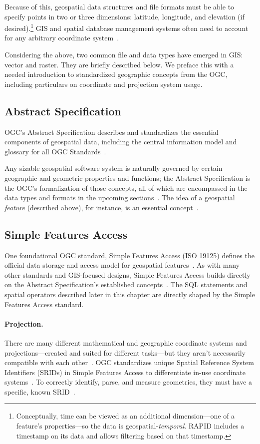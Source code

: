 Because of this, geospatial data structures and file formats must be able to specify points in two or three dimensions: latitude, longitude, and elevation (if desired).\footnote{Conceptually, time can be viewed as an additional dimension---one of a feature's properties---so the data is geospatial-\textit{temporal}. RAPID includes a timestamp on its data and allows filtering based on that timestamp.} GIS and spatial database management systems often need to account for any arbitrary coordinate system~\cite{gentle_intro}.

Considering the above, two common file and data types have emerged in GIS: vector and raster. They are briefly described below. We preface this with a needed introduction to standardized geographic concepts from the OGC, including particulars on coordinate and projection system usage.

\subsection{Abstract Specification}
OGC's Abstract Specification describes and standardizes the essential components of geospatial data, including the central information model and glossary for all OGC Standards~\cite{AbstractSpecFaq}.

Any sizable geospatial software system is naturally governed by certain geographic and geometric properties and functions; the Abstract Specification is the OGC's formalization of those concepts, all of which are encompassed in the data types and formats in the upcoming sections~\cite{AbstractSpecFaq}. The idea of a geospatial \textit{feature} (described above), for instance, is an essential concept~\cite{Kottman2009,AbstractSpecFaq}.

\subsection{Simple Features Access}
One foundational OGC standard, Simple Features Access (ISO 19125) defines the official data storage and access model for geospatial features~\cite{SFA}. As with many other standards and GIS-focused designs, Simple Features Access builds directly on the Abstract Specification's established concepts~\cite{SFA,AbstractSpecFaq}. The SQL statements and spatial operators described later in this chapter are directly shaped by the Simple Features Access standard.

\paragraph{Projection.}
There are many different mathematical and geographic coordinate systems and projections---created and suited for different tasks---but they aren't necessarily compatible with each other~\cite{Kottman2009}. OGC standardizes unique Spatial Reference System Identifiers (SRIDs) in Simple Features Access to differentiate in-use coordinate systems~\cite{SFA}. To correctly identify, parse, and measure geometries, they must have a specific, known SRID~\cite{Kottman2009}.
  

